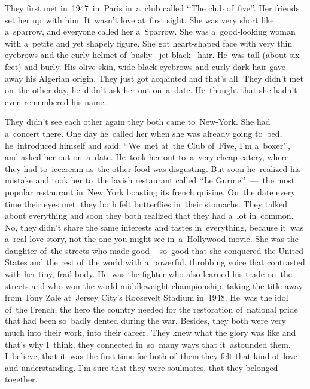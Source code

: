 
\lettrine[lines=3, loversize=0.1]{T}{}hey first met in~1947~in~Paris in~a~club called ‘‘The club of~five’’.
Her friends set her up~with him.
It~wasn't love at~first sight.
She was very short like a~sparrow, and everyone called her a~Sparrow.
She was a~good-looking woman with a~petite and yet shapely figure.
She got heart-shaped face with very thin eyebrows and the curly helmet of~bushy ~jet-black ~hair.
He~was tall (about six feet) and burly.
His olive skin, wide black eyebrows and curly dark hair gave away his Algerian origin.
They just got acqainted and that's all.
They didn't met on~the other day, he~didn't ask her out on~a~date.
He~thought that she hadn't even remembered his name.

They didn't see each other again they both came to~New-York.
She had a~concert there.
One day he~called her when she was already going to~bed, he~introduced himself and said: ‘‘We~met at~the Club of~Five, I'm a~boxer’’, and asked her out on~a~date.
He~took her out to~a~very cheap eatery, where they had to~icecream as~the other food was disgusting.
But soon he~realized his mistake and took her to~the lavish restaurant called ‘‘Le Gurme’’~---~the most popular restaurant in~New York boasting its french quisine.
On~the date every time their eyes met, they both felt butterflies in~their stomachs.
They talked about everything and soon they both realized that they had a~lot in~common.
No, they didn't share the same interests and tastes in~everything, because it~was a~real love story, not the one you might see in~a~Hollywood movie.
She was the daughter of~the streets who made good -~so~good that she conquered the United States and the rest of~the world with a~powerful, throbbing voice that contrasted with her tiny, frail body.
He~was the fighter who also learned his trade on~the streets and who won the world middleweight championship, taking the title away from Tony Zale at~Jersey City's Roosevelt Stadium in~1948.
He~was the idol of~the French, the hero the country needed for the restoration of~national pride that had been so~badly dented during the war.
Besides, they both were very much into their work, into their career.
They knew what the glory was like and that's why I~think, they connected in~so~many ways that it~astounded them.
I~believe, that it~was the first time for both of~them they felt that kind of~love and understanding.
I'm sure that they were soulmates, that they belonged together.

